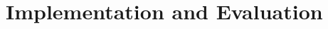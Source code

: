 \documentclass[a4paper]{llncs}
\begin{document}
\begin{enumerate}
\end{enumerate}



\section{Implementation and Evaluation}\label{sec:eval}
\end{document}
